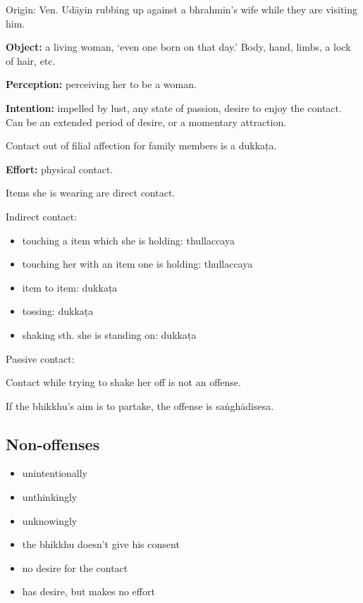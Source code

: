 \begin{multicols}{2}

Origin: Ven. Udāyin rubbing up against a bhrahmin's wife while they are
visiting him.

\textbf{Object:} a living woman, `even one born on that day.' Body,
hand, limbs, a lock of hair, etc.

\textbf{Perception:} perceiving her to be a woman.

\textbf{Intention:} impelled by lust, any state of passion, desire to
enjoy the contact. Can be an extended period of desire, or a momentary
attraction.

Contact out of filial affection for family members is a dukkaṭa.

\textbf{Effort:} physical contact.

Items she is wearing are direct contact.

Indirect contact:

\begin{itemize}
\tightlist
\item
  touching a item which she is holding: thullaccaya
\end{itemize}

\columnbreak

\begin{itemize}
\tightlist
\item
  touching her with an item one is holding: thullaccaya
\item
  item to item: dukkaṭa
\item
  tossing: dukkaṭa
\item
  shaking sth. she is standing on: dukkaṭa
\end{itemize}

Passive contact:

Contact while trying to shake her off is not an offense.

If the bhikkhu's aim is to partake, the offense is saṅghādisesa.

\subsection{Non-offenses}

\begin{itemize}
\tightlist
\item
  unintentionally
\item
  unthinkingly
\item
  unknowingly
\item
  the bhikkhu doesn't give his consent
\item
  no desire for the contact
\item
  has desire, but makes no effort
\end{itemize}

\end{multicols}

